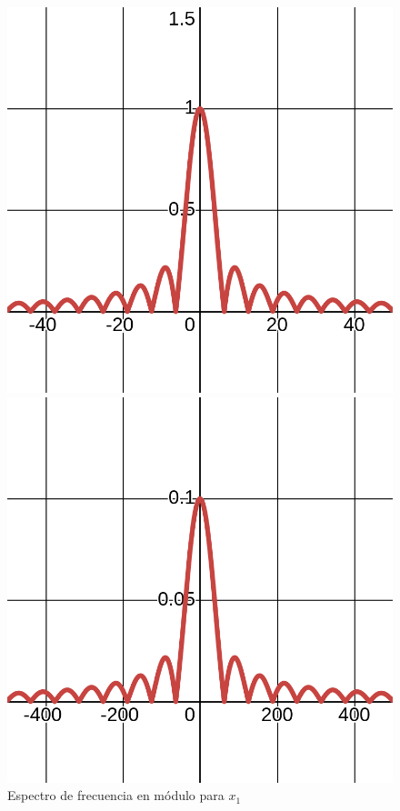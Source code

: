 \documentclass[12pt,a4paper]{report}
\begin{document}
\begin{enumerate}[label=\alph*),left=0pt]
\begin {itemize}[left=0pt]
        \begin{figure}[h!]
          \hspace{10mm}
          \begin{minipage}{0.45\textwidth}
            \centering
            \includegraphics[width=\textwidth]{images/ej3.5}
            \caption{Espectro de frecuencia en módulo para $x_1$}
            \label{fig:imagen1}
          \end{minipage}
          \hfill
          \begin{minipage}{0.45\textwidth}
            \centering
            \includegraphics[width=\textwidth]{images/ej3.6}

\end{minipage}
\end{figure}
\end{itemize}
\end{enumerate}
\end{document}
